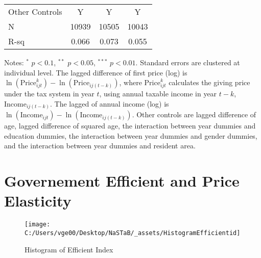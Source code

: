 \documentclass[ review  , 3p ]{elsarticle}
\begin{document}
\begin{table}
\begin{threeparttable}
\begin{tabular}[t]{lccc}
  \hspace{1em}Other Controls & Y & Y & Y\\
  \hspace{1em}N & 10939 & 10505 & 10043\\
  \hspace{1em}R-sq & 0.066 & 0.073 & 0.055\\
  \bottomrule
  \end{tabular}
  \begin{tablenotes}
  \item Notes: $^{*}$ $p < 0.1$, $^{**}$ $p < 0.05$, $^{***}$ $p < 0.01$. Standard errors are clustered at individual level. The lagged difference of first price (log) is $\ln(\text{Price}^k_{ijt}) - \ln(\text{Price}_{ij(t-k)})$, where $\text{Price}^k_{ijt}$ calculates the giving price under the tax system in year $t$, using annual taxable income in year $t-k$, $\text{Income}_{ij(t-k)}$. The lagged of annual income (log) is $\ln(\text{Income}_{ijt}) - \ln(\text{Income}_{ij(t-k)})$. Other controls are lagged difference of age, lagged difference of squared age, the interaction between year dummies and education dummies, the interaction between year dummies and gender dummies, and the interaction between year dummies and resident area.
  \end{tablenotes}
  \end{threeparttable}
  \end{table}
  
  \hypertarget{governement-efficient-and-price-elasticity}{%
  \section{Governement Efficient and Price Elasticity}\label{governement-efficient-and-price-elasticity}}
  
  \begin{figure}
  
  {\centering \texttt{[image: C:/Users/vge00/Desktop/NaSTaB/\_assets/HistogramEfficientid]} 
  
  }
  
  \caption{Histogram of Efficient Index}\label{fig:unnamed-chunk-6}
  \end{figure}
  
\end{document}
